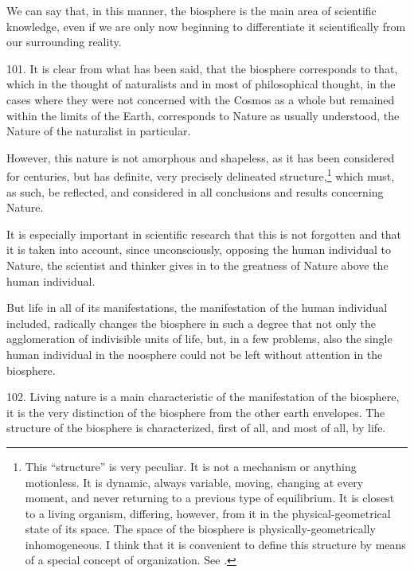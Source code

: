 We can say that, in this manner, the biosphere is the main area of scientific
knowledge, even if we are only now beginning to differentiate it scientifically
from our surrounding reality.


101. It is clear from what has been said, that the biosphere corresponds to
that, which in the thought of naturalists and in most of philosophical
thought, in the cases where they were not concerned with the Cosmos as a
whole but remained within the limits of the Earth, corresponds to Nature as
usually understood, the Nature of the naturalist in particular.

However, this nature is not amorphous and shapeless, as it has been considered
for centuries, but has definite, very precisely delineated
structure,\footnote{
	This ``structure'' is very peculiar.  It is not a mechanism or anything
	motionless.  It is dynamic, always variable, moving, changing at every
	moment, and never returning to a previous type of equilibrium.  It is
	closest to a living organism, differing, however, from it in the
	physical-geometrical state of its space.  The space of the biosphere is
	physically-geometrically inhomogeneous.  I think that it is convenient
	to define this structure by means of a special concept of organization.
	See .
} which must, as such,
be reflected, and considered in all conclusions and results concerning Nature.

It is especially important in scientific research that this is not forgotten
and that it is taken into account, since unconsciously, opposing the human
individual to Nature, the scientist and thinker gives in to the greatness of
Nature above the human individual.

But life in all of its manifestations, the manifestation of the human
individual included, radically changes the biosphere in such a degree that not
only the agglomeration of indivisible units of life, but, in a few problems,
also the single human individual in the noosphere could not be left without
attention in the biosphere.


102. Living nature is a main characteristic of the manifestation of the biosphere, it is the
very distinction of the biosphere from the other earth envelopes.  The
structure of the biosphere is characterized, first of all, and most of all, by
life.


